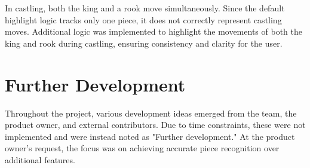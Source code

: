 In \gls{castling}, both the king and a rook move simultaneously. Since the default highlight logic tracks only one piece, it does not correctly represent \gls{castling} moves. Additional logic was implemented to highlight the movements of both the king and rook during \gls{castling}, ensuring consistency and clarity for the user.
















\section{Further Development}
Throughout the project, various development ideas emerged from the team, the product owner, and external contributors. Due to time constraints, these were not implemented and were instead noted as "Further development." At the product owner's request, the focus was on achieving accurate piece recognition over additional features.

